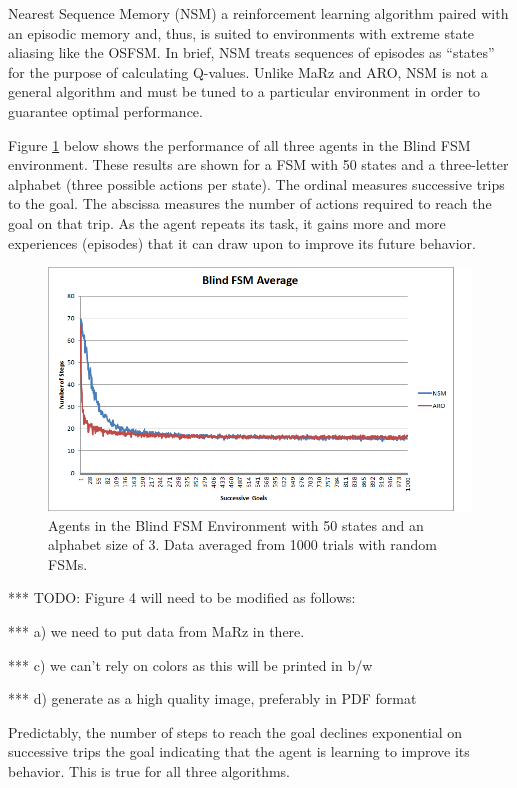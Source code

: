 \documentclass[letterpaper]{article} %
\begin{document}
Nearest Sequence Memory (NSM) a reinforcement learning algorithm
paired with an episodic memory and, thus, is suited to environments
with extreme state aliasing like the OSFSM.  In brief, NSM treats
sequences of episodes as ``states'' for the purpose of calculating
Q-values.  Unlike MaRz and ARO, NSM is not a general algorithm and
must be tuned to a particular environment in order to guarantee
optimal performance.

Figure \ref{fig4} below shows the performance of all three agents in
the Blind FSM environment.  These results are shown for a FSM with
50 states and a three-letter alphabet (three possible actions per
state).  The ordinal measures successive trips to the goal.  The
abscissa measures the number of actions required to reach the goal on
that trip.  As the agent repeats its task, it gains more and more
experiences (episodes) that it can draw upon to improve its future
behavior.

\begin{figure}[t]
  \centering
  \includegraphics[width=0.9\columnwidth]{BlindFSMGraph.png} %
  \caption{Agents in the Blind FSM Environment with 50 states and an alphabet size of 3. Data averaged from 1000 trials with random FSMs.}
  \label{fig4}
\end{figure}

*** TODO: Figure 4 will need to be modified as follows:

***    a) we need to put data from MaRz in there.

***    c) we can't rely on colors as this will be printed in b/w

***    d) generate as a high quality image, preferably in PDF format


Predictably, the number of steps to reach the goal declines
exponential on successive trips the goal indicating that the agent is
learning to improve its behavior.  This is true for all three
algorithms.
\end{document}

